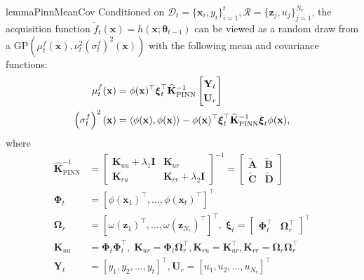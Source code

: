 \begin{restatable}{lemma}{PinnMeanCov} 
\label{lemma:pinn-bo_PINN_mean_cov}
Conditioned on $\mathcal{D}_t = \{\mathbf{x}_i, y_i\}_{i=1}^t, \mathcal{R} = \{\mathbf{z}_j, u_j\}_{j=1}^{N_r}$, the acquisition function $\widetilde{f}_t(\mathbf{x}) = h(\mathbf{x}; \boldsymbol{\theta}_{t-1})$ can be viewed as a random draw from a $\mathrm{GP}\left(\mu_{t}^f (\mathbf{x}), \nu_t^2 \left(\sigma^f_t\right)^2(\mathbf{x})\right)$ with the following mean and covariance functions:
\begin{equation*}
\begin{split}
     \mu_{t}^f (\mathbf{x}) &= \phi(\mathbf{x})^\top \boldsymbol{\xi}_t^\top \mathbf{\widehat{K}}_\mathrm{PINN}^{-1} 
     \renewcommand\arraystretch{1.2}
     \begin{bmatrix}
         \mathbf{Y}_t \\
         \mathbf{U}_r
     \end{bmatrix} \\
    \left(\sigma^f_t\right)^2(\mathbf{x}) &=  \langle \phi(\mathbf{x}),  \phi(\mathbf{x}) \rangle - \phi(\mathbf{x})^\top \boldsymbol{\xi}_t^\top \mathbf{\widehat{K}}_\mathrm{PINN}^{-1} \boldsymbol{\xi}_t \phi(\mathbf{x}), \\
\end{split}
\end{equation*}
where 
\begin{equation*}
    \renewcommand\arraystretch{1.2}
    \begin{split}
\mathbf{\widehat{K}}_\mathrm{PINN}^{-1} &=  
    \begin{bmatrix}
    \mathbf{K}_{uu} + \lambda_1 \mathbf{I} & \mathbf{K}_{ur} \\
    \mathbf{K}_{ru} & \mathbf{K}_{rr} + \lambda_2 \mathbf{I}
    \end{bmatrix} ^{-1}  = \begin{bmatrix}
    \widetilde{\mathbf{A}} & \widetilde{\mathbf{B}} \\
    \widetilde{\mathbf{C}} & \widetilde{\mathbf{D}}
    \end{bmatrix}\\
    \boldsymbol{\Phi}_t & = [\phi(\mathbf{x}_1)^\top,\dots, \phi(\mathbf{x}_t)^\top ] ^\top \\
    \boldsymbol{\Omega}_r & = [\omega(\mathbf{z}_1)^\top, \dots, \omega(\mathbf{z}_{N_r})^\top ] ^\top, \; \boldsymbol{\xi}_t = \begin{bmatrix}
    \boldsymbol{\Phi}_t^\top & \boldsymbol{\Omega}_r^\top  
    \end{bmatrix}^\top \\
    \mathbf{K}_{uu} &= \boldsymbol{\Phi}_t \boldsymbol{\Phi}_t^\top, \;  \mathbf{K}_{ur} = \boldsymbol{\Phi}_t \boldsymbol{\Omega}_r^\top,\mathbf{K}_{ru} = \mathbf{K}_{ur}^\top, \mathbf{K}_{rr} = \boldsymbol{\Omega}_r \boldsymbol{\Omega}_r^\top \\
    \mathbf{Y}_t &= [y_1, y_2, \dots, y_t]^\top, 
    \mathbf{U}_r = [u_1, u_2, \dots, u_{N_r}]^\top \\
    \end{split}
\end{equation*}
\end{restatable}

